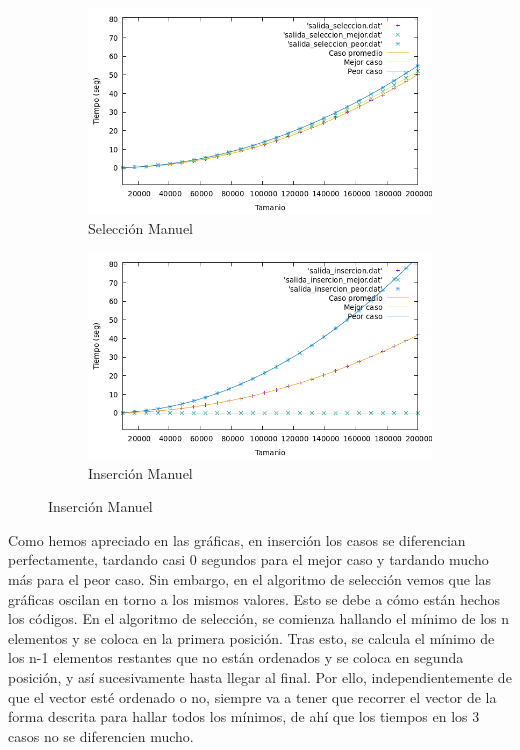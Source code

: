 \documentclass[10pt,a4paper]{article}
\begin{document}
\begin{figure}[h!]
	\begin{subfigure}{.5\textwidth}
		\centering
		\includegraphics[scale=0.3]{../../Images/Casos_seleccion_ManuelMoya.png}
		\caption{Selección Manuel}
	\end{subfigure}
	\hfill
	\begin{subfigure}{.5\textwidth}
		\centering
		\includegraphics[scale=0.3]{../../Images/Casos_insercion_ManuelMoya.png}
		\caption{Inserción Manuel}
	\end{subfigure}
\end{figure}


\newpage


Como hemos apreciado en las gráficas, en inserción los casos se diferencian perfectamente, tardando casi 0 segundos para el mejor caso y tardando mucho más para el peor caso. Sin embargo, en el algoritmo de selección vemos que las gráficas oscilan en torno a los mismos valores. Esto se debe a cómo están hechos los códigos. En el algoritmo de selección, se comienza hallando el mínimo de los n elementos y se coloca en la primera posición. Tras esto, se calcula el mínimo de los n-1 elementos restantes que no están ordenados y se coloca en segunda posición, y así sucesivamente hasta llegar al final. Por ello, independientemente de que el vector esté ordenado o no, siempre va a tener que recorrer el vector de la forma descrita para hallar todos los mínimos, de ahí que los tiempos en los 3 casos no se diferencien mucho.\\
\end{document}
